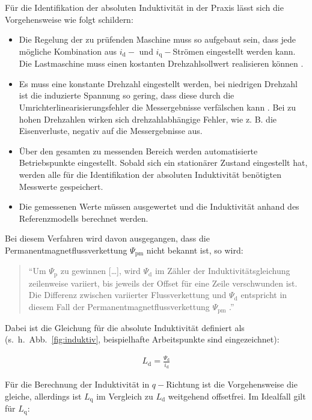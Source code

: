 \documentclass[conference,twocolumn]{IEEEtran}
\newcommand{\x}[1]{\mathrm{#1}}
\begin{document}
Für die Identifikation der absoluten Induktivität in der Praxis lässt sich die Vorgehensweise wie folgt schildern:

\begin{itemize}
\item Die Regelung der zu prüfenden Maschine muss so aufgebaut sein, dass jede mögliche Kombination aus $i_\x{d}-$ und $i_\x{q}-$Strömen eingestellt werden kann. Die Lastmaschine muss einen kostanten Drehzahlsollwert realisieren können \autocite{Kellner2012}.
\item Es muss eine konstante Drehzahl eingestellt werden, bei niedrigen Drehzahl ist die induzierte Spannung so gering, dass diese durch die Umrichterlinearisierungsfehler die Messergebnisse verfälschen kann \autocite{Perassi2006}. Bei zu hohen Drehzahlen wirken sich drehzahlabhängige Fehler, wie z. B. die Eisenverluste, negativ auf die Messergebnisse aus.
\item Über den gesamten zu messenden Bereich werden automatisierte Betriebspunkte eingestellt. Sobald sich ein stationärer Zustand eingestellt hat, werden alle für die Identifikation der absoluten Induktivität benötigten Messwerte gespeichert.
\item Die gemessenen Werte müssen ausgewertet und die Induktivität anhand des Referenzmodells berechnet werden.
\end{itemize}

Bei diesem Verfahren wird davon ausgegangen, dass die Permanentmagnetflussverkettung $\Psi_\x{pm}$ nicht bekannt ist, so wird:

\begin{quote}
\enquote{Um $\Psi_\x{p}$ zu gewinnen [\ldots], wird $\Psi_\x{d}$ im Zähler der Induktivitätsgleichung zeilenweise variiert, bis jeweils der Offset für eine Zeile verschwunden
ist. Die Differenz zwischen variierter Flussverkettung und $\Psi_\x{d}$ entspricht in diesem Fall der Permanentmagnetflussverkettung $\Psi_\x{pm}$ \autocite[S.~109]{Kellner2012}.}
\end{quote}

Dabei ist die Gleichung für die absolute Induktivität definiert als (s.~h.~Abb.~\ref{fig:induktiv}, beispielhafte Arbeitspunkte sind eingezeichnet):

\begin{align}
L_\x{d} = \frac{\Psi_\x{d}}{i_\x{d}}
\end{align}

Für die Berechnung der Induktivität in $q-$Richtung ist die Vorgehensweise die gleiche, allerdings ist $L_\x{q}$ im Vergleich zu $L_\x{d}$ weitgehend offsetfrei.
Im Idealfall gilt für $L_\x{q}$:
\end{document}
